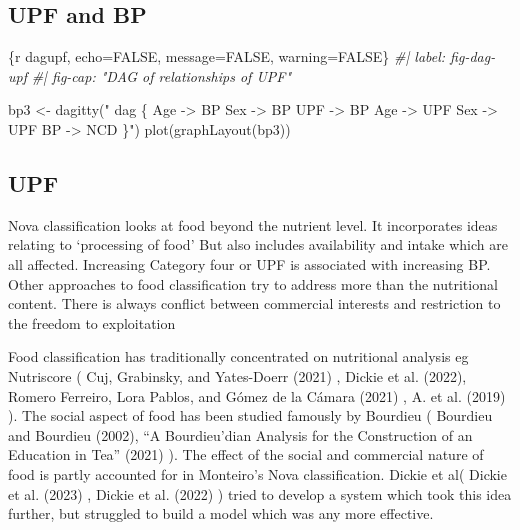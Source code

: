 \documentclass[
]{article}
\newenvironment{Shaded}{\begin{snugshade}}{\end{snugshade}}
\newcommand{\CommentTok}[1]{\textcolor[rgb]{0.56,0.35,0.01}{\textit{#1}}}
\newcommand{\ConstantTok}[1]{\textcolor[rgb]{0.00,0.00,0.00}{#1}}
\newcommand{\FunctionTok}[1]{\textcolor[rgb]{0.00,0.00,0.00}{#1}}
\newcommand{\NormalTok}[1]{#1}
\newcommand{\OtherTok}[1]{\textcolor[rgb]{0.56,0.35,0.01}{#1}}
\newcommand{\StringTok}[1]{\textcolor[rgb]{0.31,0.60,0.02}{#1}}
\begin{document}
\hypertarget{upf-and-bp}{%
\subsection{UPF and BP}\label{upf-and-bp}}

\hypertarget{dagupf}{%
\label{dagupf}}%
\begin{Shaded}
\begin{Highlighting}[]
\NormalTok{\{r dagupf, echo}\OtherTok{=}\ConstantTok{FALSE}\NormalTok{, message}\OtherTok{=}\ConstantTok{FALSE}\NormalTok{, warning}\OtherTok{=}\ConstantTok{FALSE}\NormalTok{\}}
\CommentTok{\#| label: fig{-}dag{-}upf}
\CommentTok{\#| fig{-}cap: "DAG of relationships of UPF"}

\NormalTok{bp3 }\OtherTok{\textless{}{-}} \FunctionTok{dagitty}\NormalTok{(}\StringTok{" dag \{}
\StringTok{             }
\StringTok{               Age {-}\textgreater{} BP}
\StringTok{               Sex {-}\textgreater{} BP}
\StringTok{               UPF {-}\textgreater{} BP}
\StringTok{              Age {-}\textgreater{} UPF}
\StringTok{               Sex {-}\textgreater{} UPF}
\StringTok{               BP {-}\textgreater{} NCD}
\StringTok{              }
\StringTok{\}"}\NormalTok{)}
\FunctionTok{plot}\NormalTok{(}\FunctionTok{graphLayout}\NormalTok{(bp3))}
\end{Highlighting}
\end{Shaded}

\hypertarget{upf}{%
\subsection{UPF}\label{upf}}

Nova classification looks at food beyond the nutrient level. It
incorporates ideas relating to `processing of food' But also includes
availability and intake which are all affected. Increasing Category four
or UPF is associated with increasing BP. Other approaches to food
classification try to address more than the nutritional content. There
is always conflict between commercial interests and restriction to the
freedom to exploitation

Food classification has traditionally concentrated on nutritional
analysis eg Nutriscore ( Cuj, Grabinsky, and Yates-Doerr (2021) , Dickie
et al. (2022), Romero Ferreiro, Lora Pablos, and Gómez de la Cámara
(2021) , A. et al. (2019) ). The social aspect of food has been studied
famously by Bourdieu ( Bourdieu and Bourdieu (2002), {``A
Bourdieu{'}dian Analysis for the Construction of an Education in Tea''}
(2021) ). The effect of the social and commercial nature of food is
partly accounted for in Monteiro's Nova classification. Dickie et al(
Dickie et al. (2023) , Dickie et al. (2022) ) tried to develop a system
which took this idea further, but struggled to build a model which was
any more effective.
\end{document}
